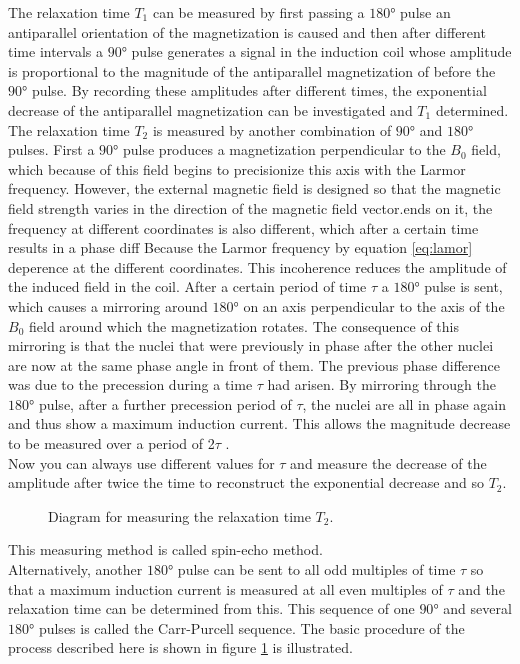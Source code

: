 The relaxation time $T_1$ can be measured by first passing a $\ang{180}$ pulse
an antiparallel orientation of the magnetization is caused and then after different time intervals a $\ang{90}$ pulse generates a signal in the induction coil whose amplitude is proportional to the magnitude of the antiparallel magnetization of before the $\ang{90}$ pulse.
By recording these amplitudes after different times, the exponential decrease of the antiparallel magnetization can be investigated and $T_1$ determined.\\

The relaxation time $T_2$ is measured by another combination of $\ang{90}$ and $\ang{180}$ pulses.
First a $\ang{90}$ pulse produces a magnetization perpendicular to the $B_0$ field, which because of this field begins to precisionize this axis with the Larmor frequency.
However, the external magnetic field is designed so that the magnetic field strength varies in the direction of the magnetic field vector.ends on it, the frequency at different coordinates is also different, which after a certain time results in a phase diff
Because the Larmor frequency by equation \ref{eq:lamor} deperence at the different coordinates.
This incoherence reduces the amplitude of the induced field in the coil.
After a certain period of time $\tau$ a $\ang{180}$ pulse is sent, which causes a mirroring around $\ang{180}$ on an axis perpendicular to the axis of the $B_0$ field around which the magnetization rotates.
The consequence of this mirroring is that the nuclei that were previously in phase after the other nuclei are now at the same phase angle in front of them. 
The previous phase difference was due to the precession during a time $\tau$ had arisen.
By mirroring through the $\ang{180}$ pulse, after a further precession period of $\tau$, the nuclei are all in phase again and thus show a maximum induction current.
This allows the magnitude decrease to be measured over a period of 2$\tau$ .\\
Now you can always use different values for $\tau$ and measure the decrease of the amplitude after twice the time to reconstruct the exponential decrease and so $T_2$.
\begin{figure}[ht]
\centering

\caption{Diagram for measuring the relaxation time $T_2$.}
\label{fig:relaxation}
\end{figure}
This measuring method is called spin-echo method.\\

Alternatively, another $\ang{180}$ pulse can be sent to all odd multiples of time $\tau$ so that a maximum induction current is measured at all even multiples of $\tau$ and the relaxation time can be determined from this.
This sequence of one $\ang{90}$ and several $\ang{180}$ pulses is called the Carr-Purcell sequence.
The basic procedure of the process described here is shown in figure \ref{fig:relaxation} is illustrated.



